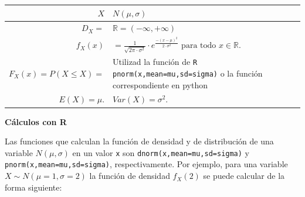 \documentclass[]{book}
\begin{document}
\begin{longtable}[]{@{}rl@{}}
\toprule
\begin{minipage}[b]{0.38\columnwidth}\raggedleft
\(X\)\strut
\end{minipage} & \begin{minipage}[b]{0.56\columnwidth}\raggedright
\(N(\mu,\sigma)\)\strut
\end{minipage}\tabularnewline
\midrule
\endhead
\begin{minipage}[t]{0.38\columnwidth}\raggedleft
\(D_X=\)\strut
\end{minipage} & \begin{minipage}[t]{0.56\columnwidth}\raggedright
\(\mathbb{R}=(-\infty,+\infty)\)\strut
\end{minipage}\tabularnewline
\begin{minipage}[t]{0.38\columnwidth}\raggedleft
\(f_{X}(x)\)\strut
\end{minipage} & \begin{minipage}[t]{0.56\columnwidth}\raggedright
\(=\frac{1}{\sqrt{2\pi\cdot\sigma^2}}\cdot e^{\frac{-(x-\mu)^2}{2\cdot \sigma^2}}\mbox{ para todo }x\in \mathbb{R}.\)\strut
\end{minipage}\tabularnewline
\begin{minipage}[t]{0.38\columnwidth}\raggedleft
\(F_X(x)=P(X\leq X)=\)\strut
\end{minipage} & \begin{minipage}[t]{0.56\columnwidth}\raggedright
Utilizad la función de \texttt{R} \texttt{pnorm(x,mean=mu,sd=sigma)} o la función correspondiente en python\strut
\end{minipage}\tabularnewline
\begin{minipage}[t]{0.38\columnwidth}\raggedleft
\(E(X)=\mu.\)\strut
\end{minipage} & \begin{minipage}[t]{0.56\columnwidth}\raggedright
\(Var(X)=\sigma^2.\)\strut
\end{minipage}\tabularnewline
\bottomrule
\end{longtable}

\textbf{Cálculos con R}

Las funciones que calculan la función de densidad y de distribución de una variable \(N(\mu,\sigma)\) en un valor \texttt{x} son \texttt{dnorm(x,mean=mu,sd=sigma)} y \texttt{pnorm(x,mean=mu,sd=sigma)}, respectivamente. Por ejemplo, para una variable \(X\sim N(\mu=1,\sigma=2)\) la función de densidad \(f_X(2)\) se puede calcular de la forma siguiente:
\end{document}
